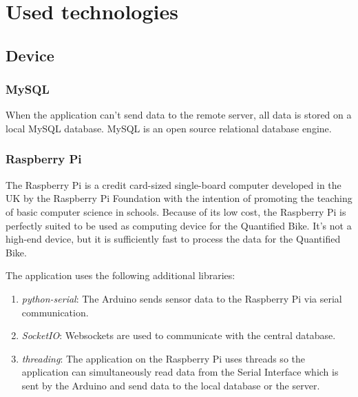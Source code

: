 \section{Used technologies}
\subsection{Device}
\subsubsection{MySQL}
When the application can't send data to the remote server, all data is stored on a local MySQL database. MySQL is an open source relational database engine.

\subsubsection{Raspberry Pi}

The Raspberry Pi is a credit card-sized single-board computer developed in the UK by the Raspberry Pi Foundation with the intention of promoting the teaching of basic computer science in schools.\cite{RaspberryWikipedia}
Because of its low cost, the Raspberry Pi is perfectly suited to be used as computing device for the Quantified Bike. 
It's not a high-end device, but it is sufficiently fast to process the data for the Quantified Bike.

The application uses the following additional libraries:
\begin{enumerate}
 \item \textit{python-serial}: The Arduino sends sensor data to the Raspberry Pi via serial communication.
 \item \textit{SocketIO}: Websockets are used to communicate with the central database.
 \item \textit{threading}: The application on the Raspberry Pi uses threads so the application can simultaneously read data from the Serial Interface which is sent by the Arduino and send data to the local database or the server.
\end{enumerate}

